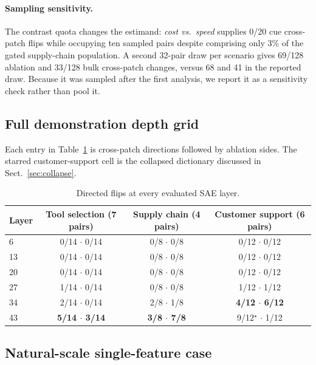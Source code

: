 \documentclass{article}
\begin{document}
\paragraph{Sampling sensitivity.}
The contrast quota changes the estimand: \emph{cost vs.\ speed} supplies 0/20
cue cross-patch flips while occupying ten sampled pairs despite comprising only
3\% of the gated supply-chain population. A second 32-pair draw per scenario
gives 69/128 ablation and 33/128 bulk cross-patch changes, versus 68 and 41 in
the reported draw. Because it was sampled after the first analysis, we report
it as a sensitivity check rather than pool it.

\subsection{Full demonstration depth grid}

Each entry in Table~\ref{tab:depth-full} is cross-patch directions followed by
ablation sides. The starred customer-support cell is the collapsed dictionary
discussed in Sect.~\ref{sec:collapse}.

\begin{table}[h]
\caption{Directed flips at every evaluated SAE layer.}
\label{tab:depth-full}
\centering
\small
\setlength{\tabcolsep}{7pt}
\begin{tabular}{@{}lccc@{}}
\toprule
Layer & Tool selection (7 pairs) & Supply chain (4 pairs) & Customer support (6 pairs) \\
\midrule
6  & 0/14 $\cdot$ 0/14 & 0/8 $\cdot$ 0/8 & 0/12 $\cdot$ 0/12 \\
13 & 0/14 $\cdot$ 0/14 & 0/8 $\cdot$ 0/8 & 0/12 $\cdot$ 0/12 \\
20 & 0/14 $\cdot$ 0/14 & 0/8 $\cdot$ 0/8 & 0/12 $\cdot$ 0/12 \\
27 & 1/14 $\cdot$ 0/14 & 0/8 $\cdot$ 0/8 & 1/12 $\cdot$ 1/12 \\
34 & 2/14 $\cdot$ 0/14 & 2/8 $\cdot$ 1/8 & \textbf{4/12 $\cdot$ 6/12} \\
43 & \textbf{5/14 $\cdot$ 3/14} & \textbf{3/8 $\cdot$ 7/8} & 9/12$^\star$ $\cdot$ 1/12 \\
\bottomrule
\end{tabular}
\end{table}

\subsection{Natural-scale single-feature case}
\end{document}
